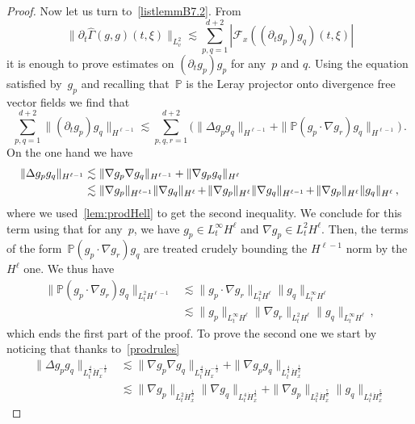 \documentclass[11pt]{article}
\theoremstyle{definition}
\numberwithin{equation}{section}
\numberwithin{figure}{section}
\numberwithin{table}{section}
\newcommand*{\Mk}{\mkern -2mu}
\begin{document}
\begin{proof}
Now let us turn to~\eqref{listlemmB7.2}. From
\begin{equation}\label{lem:hatGamma(ii)}
\big\|\partial_t\widehat {\Gamma}(g,g)({t},\xi)\big\|_{L^2_v} \lesssim\sum_{p,q=1}^{d+2} |\mathcal{F}_x({(\partial_t g_{p }) g_{q }})(t,\xi)|
\end{equation}
it is enough to prove estimates on $(\partial_t g_p)g_p$ for any~$p$ and $q$. Using the equation satisfied by~$g_p$ and recalling that~${\mathbb P}$ is the Leray projector onto divergence free vector fields we find that
\[
\sum_{p,q=1}^{d+2} \|(\partial_t g_{p }) g_{q }\|_{H^{\ell-1}} \lesssim\sum_{p,q,r=1}^{d+2}\Big(\|\Delta g_p g_q\|_{H^{\ell-1} } + \|{\mathbb P}(g_p \cdot\nabla g_r)g_q\|_{H^{\ell-1} }\Big)\,.
\]
On the one hand we have
\begin{equation}\label{eq:Deltagg}
\begin{aligned}
\|\Delta g_p g_q\|_{H^{\ell-1} }
&\lesssim \|\nabla g_p \nabla g_q\|_{H^{\ell-1} } + \|\nabla g_p g_q\|_{H^\ell} \\
&\lesssim \|\nabla g_p\|_{H^{\ell-1} } \|\nabla g_q\|_{H^\ell} \Mk+\Mk \|\nabla g_p\|_{H^\ell} \|\nabla g_q\|_{H^{\ell-1} } \Mk+\Mk \|\nabla g_p\|_{H^\ell} \|g_q\|_{H^\ell}\,,
\end{aligned}
\end{equation}
where we used~\eqref{lem:prodHell} to get the second inequality. We conclude for this term using that for any~$p$, we have $g_p \in L^\infty_t H^\ell$ and $\nabla g_p \in L^2_t H^\ell $. Then, the terms of the form~${\mathbb P}(g_p \cdot\nabla g_r)g_q$ are treated crudely bounding the $H^{\ell-1} $ norm by the $H^\ell$ one. We thus have
\begin{align*}
\|{\mathbb P}(g_p \cdot\nabla g_r)g_q\|_{L^2_t H^{\ell-1} } &\lesssim \|g_p\cdot\nabla g_r\|_{L^2_t H^\ell } \|g_q\|_{L^\infty_t H^\ell}\\
&\lesssim \| g_p\|_{L^\infty_t H^\ell} \| \nabla g_r\|_{L^2_t H^\ell} \|g_q\|_{L^\infty_t H^\ell} \,,
\end{align*}
which ends the first part of the proof. To prove the second one we start by noticing that thanks to~\eqref{prodrules}
\begin{align*}
\| \Delta g_p g_q\|_{L^\frac43_{t} \dot H^{-\frac12}_{x} }& \lesssim \|\nabla g_p \nabla g_q\|_{L^\frac43_{t} \dot H^{-\frac12}_{x}} + \|\nabla g_p g_q\|_{L^\frac43_{t} \dot H^{ \frac12}_{x} }\\
& \lesssim \|\nabla g_p\|_{L^2_{t} \dot H^{ \frac12}_{x}} \| \nabla g_q\|_{L^4_{t} \dot H^{ \frac12}_{x}} + \|\nabla g_p\|_{L^2_{t} \dot H^{ \frac76}_{x}} \| g_q\|_{L^4_{t} \dot H^{ \frac56}_{x}}

\end{align*}
\end{proof}
\end{document}
